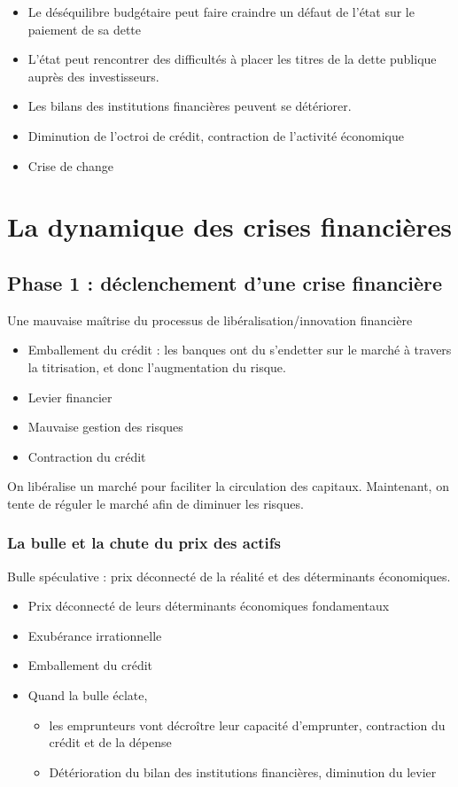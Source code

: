 	\begin{itemize}
		\item Le déséquilibre budgétaire peut faire craindre un défaut de l'état sur le paiement de sa dette 
		\item L'état peut rencontrer des difficultés à placer les titres de la dette publique auprès des investisseurs. 
		\item Les bilans des institutions financières peuvent se détériorer. 
		\item Diminution de l'octroi de crédit, contraction de l'activité économique
		\item Crise de change
	\end{itemize}


\section{La dynamique des crises financières}

	
	\subsection{Phase 1 : déclenchement d'une crise financière}
	
	Une mauvaise maîtrise du processus de libéralisation/innovation financière 
\begin{itemize}
	\item Emballement du crédit : les banques ont du s'endetter sur le marché à travers la titrisation, et donc l'augmentation du risque.
	\item Levier financier 
	\item Mauvaise gestion des risques 
	\item Contraction du crédit 
\end{itemize}

	On libéralise un marché pour faciliter la circulation des capitaux. Maintenant, on tente de réguler le marché afin de diminuer les risques.

	\subsubsection{La bulle et la chute du prix des actifs}
	
	Bulle spéculative : prix déconnecté de la réalité et des déterminants économiques.
	
	\begin{itemize}
		\item Prix déconnecté de leurs déterminants économiques fondamentaux 
		\item Exubérance irrationnelle 
		\item Emballement du crédit 
		\item Quand la bulle éclate, 
		\begin{itemize}
			\item les emprunteurs vont décroître leur capacité d'emprunter, contraction du crédit et de la dépense 
			\item Détérioration du bilan des institutions financières, diminution du levier
		\end{itemize}
	\end{itemize}
	
